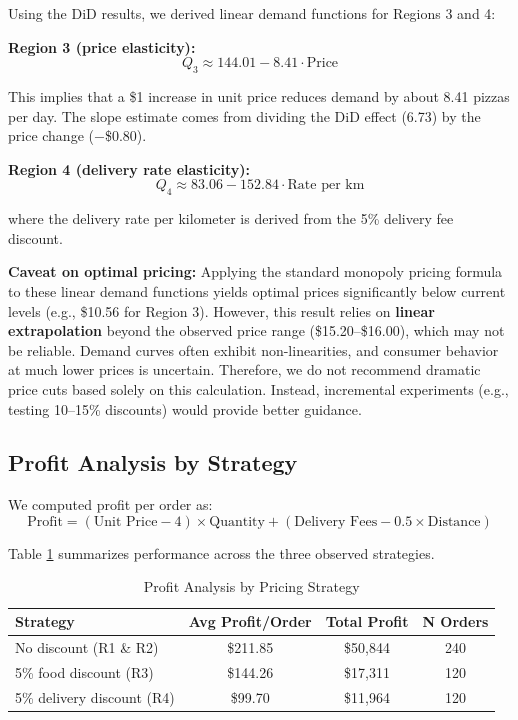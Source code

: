 \documentclass[12pt]{article}
\begin{document}
Using the DiD results, we derived linear demand functions for Regions 3 and 4:

\textbf{Region 3 (price elasticity):}
\[
Q_3 \approx 144.01 - 8.41 \cdot \text{Price}
\]

This implies that a \$1 increase in unit price reduces demand by about 8.41 pizzas per day. The slope estimate comes from dividing the DiD effect (6.73) by the price change ($-$\$0.80).

\textbf{Region 4 (delivery rate elasticity):}
\[
Q_4 \approx 83.06 - 152.84 \cdot \text{Rate per km}
\]

where the delivery rate per kilometer is derived from the 5\% delivery fee discount.

\textbf{Caveat on optimal pricing:} Applying the standard monopoly pricing formula to these linear demand functions yields optimal prices significantly below current levels (e.g., \$10.56 for Region 3). However, this result relies on \textbf{linear extrapolation} beyond the observed price range (\$15.20--\$16.00), which may not be reliable. Demand curves often exhibit non-linearities, and consumer behavior at much lower prices is uncertain. Therefore, we do not recommend dramatic price cuts based solely on this calculation. Instead, incremental experiments (e.g., testing 10--15\% discounts) would provide better guidance.

\subsection{Profit Analysis by Strategy}

We computed profit per order as:
\[
\text{Profit} = (\text{Unit Price} - 4) \times \text{Quantity} + (\text{Delivery Fees} - 0.5 \times \text{Distance})
\]

Table \ref{tab:profit} summarizes performance across the three observed strategies.

\begin{table}[H]
\centering
\caption{Profit Analysis by Pricing Strategy}
\label{tab:profit}
\begin{tabular}{lccc}
\toprule
\textbf{Strategy} & \textbf{Avg Profit/Order} & \textbf{Total Profit} & \textbf{N Orders} \\
\midrule
No discount (R1 \& R2) & \$211.85 & \$50,844 & 240 \\
5\% food discount (R3) & \$144.26 & \$17,311 & 120 \\
5\% delivery discount (R4) & \$99.70 & \$11,964 & 120 \\
\bottomrule
\end{tabular}
\end{table}
\end{document}
